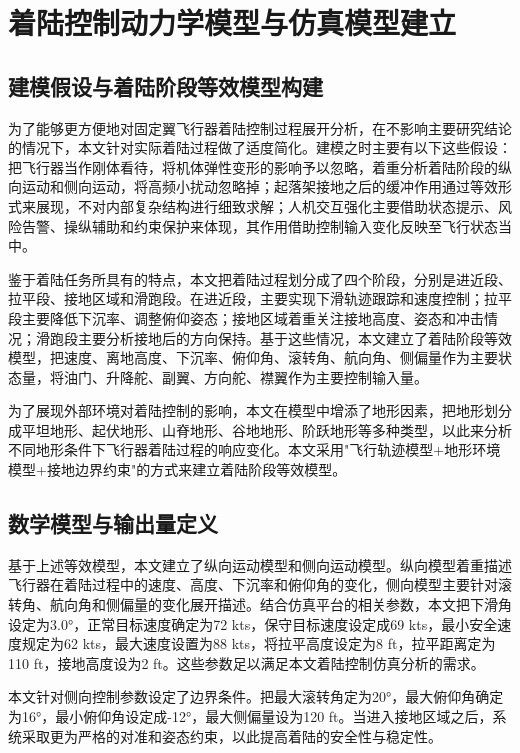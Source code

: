 \chapter{着陆控制动力学模型与仿真模型建立}

\section{建模假设与着陆阶段等效模型构建}

为了能够更方便地对固定翼飞行器着陆控制过程展开分析，在不影响主要研究结论的情况下，本文针对实际着陆过程做了适度简化。建模之时主要有以下这些假设：把飞行器当作刚体看待，将机体弹性变形的影响予以忽略，着重分析着陆阶段的纵向运动和侧向运动，将高频小扰动忽略掉；起落架接地之后的缓冲作用通过等效形式来展现，不对内部复杂结构进行细致求解；人机交互强化主要借助状态提示、风险告警、操纵辅助和约束保护来体现，其作用借助控制输入变化反映至飞行状态当中。

鉴于着陆任务所具有的特点，本文把着陆过程划分成了四个阶段，分别是进近段、拉平段、接地区域和滑跑段。在进近段，主要实现下滑轨迹跟踪和速度控制；拉平段主要降低下沉率、调整俯仰姿态；接地区域着重关注接地高度、姿态和冲击情况；滑跑段主要分析接地后的方向保持。基于这些情况，本文建立了着陆阶段等效模型，把速度、离地高度、下沉率、俯仰角、滚转角、航向角、侧偏量作为主要状态量，将油门、升降舵、副翼、方向舵、襟翼作为主要控制输入量。

为了展现外部环境对着陆控制的影响，本文在模型中增添了地形因素，把地形划分成平坦地形、起伏地形、山脊地形、谷地地形、阶跃地形等多种类型，以此来分析不同地形条件下飞行器着陆过程的响应变化。本文采用"飞行轨迹模型+地形环境模型+接地边界约束"的方式来建立着陆阶段等效模型。

\section{数学模型与输出量定义}

基于上述等效模型，本文建立了纵向运动模型和侧向运动模型。纵向模型着重描述飞行器在着陆过程中的速度、高度、下沉率和俯仰角的变化，侧向模型主要针对滚转角、航向角和侧偏量的变化展开描述。结合仿真平台的相关参数，本文把下滑角设定为3.0°，正常目标速度确定为72 kts，保守目标速度设定成69 kts，最小安全速度规定为62 kts，最大速度设置为88 kts，将拉平高度设定为8 ft，拉平距离定为110 ft，接地高度设为2 ft。这些参数足以满足本文着陆控制仿真分析的需求。

本文针对侧向控制参数设定了边界条件。把最大滚转角定为20°，最大俯仰角确定为16°，最小俯仰角设定成-12°，最大侧偏量设为120 ft。当进入接地区域之后，系统采取更为严格的对准和姿态约束，以此提高着陆的安全性与稳定性。


